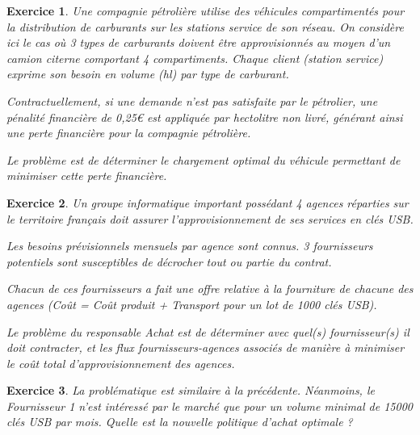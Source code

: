 \documentclass[french]{beamer}
\newtheorem{exercice}{Exercice}
\begin{document}
\begin{frame}
  \begin{exercice}
    Une  compagnie  pétrolière  utilise  des véhicules  compartimentés  pour  la
    distribution  de carburants  sur  les  stations service  de  son réseau.  On
    considère ici le cas où 3 types de carburants doivent être approvisionnés au
    moyen d’un camion citerne comportant 4 compartiments. Chaque client (station
    service)   exprime    son   besoin    en   volume    (hl)   par    type   de
    carburant.

    Contractuellement,  si une  demande n’est  pas satisfaite  par le
    pétrolier, une pénalité financière de 0,25€ est appliquée par hectolitre non
    livré, générant ainsi une perte financière pour la compagnie pétrolière.

    Le
    problème est de  déterminer le chargement optimal du  véhicule permettant de
    minimiser cette perte financière.  
  \end{exercice}
\end{frame}



\begin{frame}
  \begin{exercice}
    Un  groupe  informatique important  possédant  4  agences réparties  sur  le
    territoire  français doit  assurer  l’approvisionnement de  ses services  en
    clés USB.

    Les  besoins   prévisionnels  mensuels  par  agence   sont  connus.  3
    fournisseurs potentiels  sont susceptibles  de décrocher  tout ou  partie du
    contrat.

    Chacun  de  ces  fournisseurs  a fait  une  offre  relative  à  la
    fourniture de chacune  des agences (Coût = Coût produit  + Transport pour un
    lot de 1000 clés USB).

    Le problème  du responsable Achat est  de déterminer avec
    quel(s) fournisseur(s) il doit  contracter, et les flux fournisseurs-agences
    associés  de  manière à  minimiser  le  coût total  d’approvisionnement  des
    agences. 
  \end{exercice}
\end{frame}



\begin{frame}
  \begin{exercice}
    La problématique est similaire à  la précédente. Néanmoins, le Fournisseur 1
    n’est intéressé par le marché que pour un volume minimal de 15000 clés USB par
    mois. Quelle est la nouvelle politique d’achat optimale ? 
  \end{exercice}
\end{frame}
\end{document}
